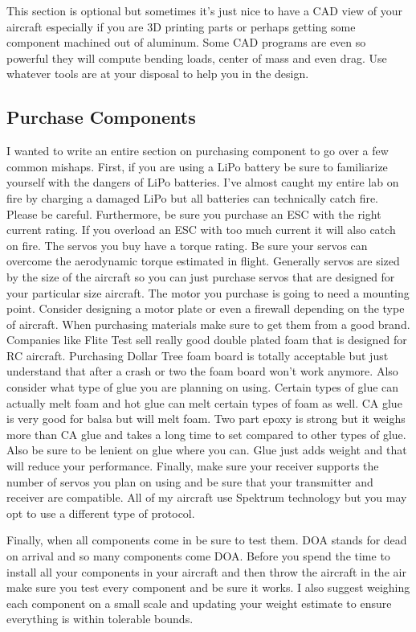 \documentclass{article}
\begin{document}
This section is optional but sometimes it's just nice to have a CAD
view of your aircraft especially if you are 3D printing parts or
perhaps getting some component machined out of aluminum. Some CAD
programs are even so powerful they will compute bending loads, center
of mass and even drag. Use whatever tools are at your disposal to help
you in the design. 

\subsection{Purchase Components}

I wanted to write an entire section on purchasing component to go over
a few common mishaps. First, if you are using a LiPo battery be sure
to familiarize yourself with the dangers of LiPo batteries. I've
almost caught my entire lab on fire by charging a damaged LiPo but all
batteries can technically catch fire. Please be careful. Furthermore,
be sure you purchase an ESC with the right current rating. If you
overload an ESC with too much current it will also catch on fire. The
servos you buy have a torque rating. Be sure your servos can overcome
the aerodynamic torque estimated in flight. Generally servos are sized
by the size of the aircraft so you can just purchase servos that are
designed for your particular size aircraft. The motor you purchase is
going to need a mounting point. Consider designing a motor plate or
even a firewall depending on the type of aircraft. When purchasing
materials make sure to get them from a good brand. Companies like
Flite Test sell really good double plated foam that is designed for RC
aircraft. Purchasing Dollar Tree foam board is totally acceptable but
just understand that after a crash or two the foam board won't work
anymore. Also consider what type of glue you are planning on
using. Certain types of glue can actually melt foam and hot glue can
melt certain types of foam as well. CA glue is very good for balsa but
will melt foam. Two part epoxy is strong but it weighs more than CA
glue and takes a long time to set compared to other types of
glue. Also be sure to be lenient on glue where you can. Glue just adds
weight and that will reduce your performance. Finally, make sure your
receiver supports the number of servos you plan on using and be sure
that your transmitter and receiver are compatible. All of my aircraft
use Spektrum technology but you may opt to use a different type of
protocol.

Finally, when all components come in be sure to test them. DOA stands
for dead on arrival and so many components come DOA. Before you spend
the time to install all your components in your aircraft and then
throw the aircraft in the air make sure you test every component and
be sure it works. I also suggest weighing each component on a small
scale and updating your weight estimate to ensure everything is within
tolerable bounds. 
\end{document}
